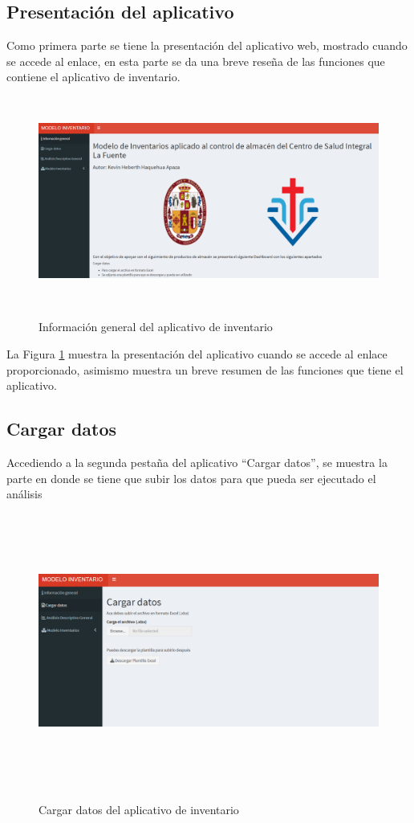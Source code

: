 \subsection{Presentación del aplicativo}
Como primera parte se tiene la presentación del aplicativo web, mostrado cuando se accede al enlace, en esta parte se da una breve reseña de las funciones que contiene el aplicativo de inventario.
\begin{figure}[H]
  \caption{Información general del aplicativo de inventario}
  {\includegraphics[width=15cm, height=6.85cm]{images/Shiny1.png}}
  \label{fig:Shiny1}
\end{figure}

La Figura \ref{fig:Shiny1} muestra la presentación del aplicativo cuando se accede al enlace proporcionado, asimismo muestra un breve resumen de las funciones que tiene el aplicativo.

\subsection{Cargar datos}
Accediendo a la segunda pestaña del aplicativo ``Cargar datos'', se muestra la parte en donde se tiene que subir los datos para que pueda ser ejecutado el análisis

\begin{figure}[H]
  \caption{Cargar datos del aplicativo de inventario}
  {\includegraphics[width=16cm, height=9cm]{images/Shiny2.png}}
  \label{fig:Shiny2}
\end{figure}

